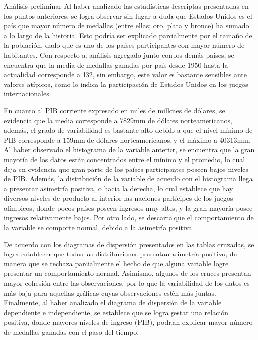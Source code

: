 \documentclass[
  ignorenonframetext,
]{beamer}
\begin{document}
\begin{frame}{Análisis preliminar}
\protect\hypertarget{anuxe1lisis-preliminar}{}
Al haber analizado las estadísticas descriptas presentadas en los puntos
anteriores, se logra observar sin lugar a duda que Estados Unidos es el
país que mayor número de medallas (entre ellas; oro, plata y bronce) ha
sumado a lo largo de la historia. Esto podría ser explicado parcialmente
por el tamaño de la población, dado que es uno de los países
participantes con mayor número de habitantes. Con respecto al análisis
agregado junto con los demás países, se encuentra que la media de
medallas ganadas por país desde 1950 hasta la actualidad corresponde a
132, sin embargo, este valor es bastante sensibles ante valores
atípicos, como lo indica la participación de Estados Unidos en los
juegos internacionales.

En cuanto al PIB corriente expresado en miles de millones de dólares, se
evidencia que la media corresponde a 7829mm de dólares norteamericanos,
además, el grado de variabilidad es bastante alto debido a que el nivel
mínimo de PIB corresponde a 159mm de dólares norteamericanos, y el
máximo a 40313mm. Al haber observado el histograma de la variable
anterior, se encuentra que la gran mayoría de los datos están
concentrados entre el mínimo y el promedio, lo cual deja en evidencia
que gran parte de los países participantes poseen bajos niveles de PIB.
Además, la distribución de la variable de acuerdo con el histograma
llega a presentar asimetría positiva, o hacia la derecha, lo cual
establece que hay diversos niveles de producto al interior las naciones
partícipes de los juegos olímpicos, donde pocos países poseen ingresos
muy altos, y la gran mayoría posee ingresos relativamente bajos. Por
otro lado, se descarta que el comportamiento de la variable se comporte
normal, debido a la asimetría positiva.

De acuerdo con los diagramas de dispersión presentados en las tablas
cruzadas, se logra establecer que todas las distribuciones presentan
asimetría positiva, de manera que se rechaza parcialmente el hecho de
que alguna variable logre presentar un comportamiento normal. Asimismo,
algunos de los cruces presentan mayor cohesión entre las observaciones,
por lo que la variabilidad de los datos es más baja para aquellas
gráficas cuyas observaciones estén más juntas. Finalmente, al haber
analizado el diagrama de dispersión de la variable dependiente e
independiente, se establece que se logra gestar una relación positiva,
donde mayores niveles de ingreso (PIB), podrían explicar mayor número de
medallas ganadas con el paso del tiempo.
\end{frame}
\end{document}

